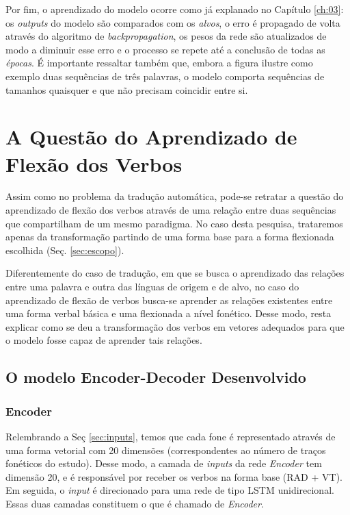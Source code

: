  
 
 Por fim, o aprendizado do modelo ocorre como já explanado no Capítulo \ref{ch:03}: os \textit{outputs} do modelo são comparados com os \textit{alvos}, o erro é propagado de volta através do algoritmo de \textit{backpropagation}, os pesos da rede são atualizados de modo a diminuir esse erro e o processo se repete até a conclusão de todas as \textit{épocas}. É importante ressaltar também que, embora a figura ilustre como exemplo duas sequências de três palavras, o modelo comporta sequências de tamanhos quaisquer e que não precisam coincidir entre si.
 
\section{A Questão do Aprendizado de Flexão dos Verbos}

Assim como no problema da tradução automática, pode-se retratar a questão do aprendizado de flexão dos verbos através de uma relação entre duas sequências que compartilham de um mesmo paradigma. No caso desta pesquisa, trataremos apenas da transformação partindo de uma forma base para a forma flexionada escolhida (Seç. \ref{sec:escopo}).



Diferentemente do caso de tradução, em que se busca o aprendizado das relações entre uma palavra e outra das línguas de origem e de alvo, no caso do aprendizado de flexão de verbos busca-se aprender as relações existentes entre uma forma verbal básica e uma flexionada a nível fonético. Desse modo, resta explicar como se deu a transformação dos verbos em vetores adequados para que o modelo fosse capaz de aprender tais relações.

\subsection{O modelo Encoder-Decoder Desenvolvido}

\subsubsection{Encoder}

Relembrando a Seç \ref{sec:inputs}, temos que cada fone é representado através de uma forma vetorial com 20 dimensões (correspondentes ao número de traços fonéticos do estudo). Desse modo, a camada de \textit{inputs} da rede \textit{Encoder} tem dimensão 20, e é responsável por receber os verbos na forma base (RAD + VT). Em seguida, o \textit{input} é direcionado para uma rede de tipo LSTM unidirecional. Essas duas camadas constituem o que é chamado de \textit{Encoder}.

